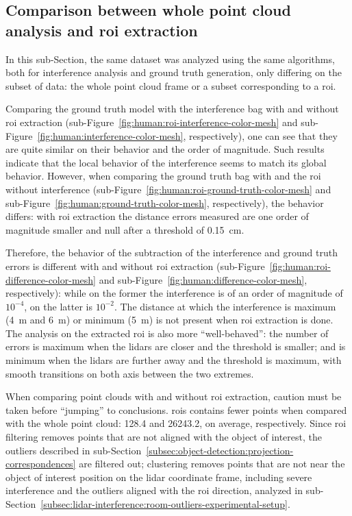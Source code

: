 \subsection{Comparison between whole point cloud analysis and \ac{roi} extraction}
In this sub-Section, the same dataset was analyzed using the same algorithms, both for interference analysis and ground truth generation, only differing on the subset of data: the whole point cloud frame or a subset corresponding to a \ac{roi}.

Comparing the ground truth model with the interference bag with and without \ac{roi} extraction (sub-Figure~\ref{fig:human:roi-interference-color-mesh} and sub-Figure~\ref{fig:human:interference-color-mesh}, respectively), one can see that they are quite similar on their behavior and the order of magnitude. Such results indicate that the local behavior of the interference seems to match its global behavior. However, when comparing the ground truth bag with and the \ac{roi} without interference (sub-Figure~\ref{fig:human:roi-ground-truth-color-mesh} and sub-Figure~\ref{fig:human:ground-truth-color-mesh}, respectively), the behavior differs: with \ac{roi} extraction the distance errors measured are one order of magnitude smaller and null after a threshold of \SI{0.15}{\centi\meter}. 

Therefore, the behavior of the subtraction of the interference and ground truth errors is different with and without \ac{roi} extraction (sub-Figure~\ref{fig:human:roi-difference-color-mesh} and sub-Figure~\ref{fig:human:difference-color-mesh}, respectively): while on the former the interference is of an order of magnitude of $10^{-4}$, on the latter is $10^{-2}$. The distance at which the interference is maximum (\SI{4}{\meter} and \SI{6}{\meter}) or minimum (\SI{5}{\meter}) is not present when \ac{roi} extraction is done. The analysis on the extracted \ac{roi} is also more ``well-behaved'': the number of errors is maximum when the \acp{lidar} are closer and the threshold is smaller; and is minimum when the \acp{lidar} are further away and the threshold is maximum, with smooth transitions on both axis between the two extremes.

When comparing point clouds with and without \ac{roi} extraction, caution must be taken before  ``jumping'' to conclusions. \acp{roi} contains fewer points when compared with the whole point cloud: 128.4 and 26243.2, on average, respectively. Since \ac{roi} filtering removes points that are not aligned with the object of interest, the outliers described in sub-Section~\ref{subsec:object-detection:projection-correspondences} are filtered out; clustering removes points that are not near the object of interest position on the \ac{lidar} coordinate frame, including severe interference and the outliers aligned with the \ac{roi} direction, analyzed in sub-Section~\ref{subsec:lidar-interference:room-outliers-experimental-setup}.

